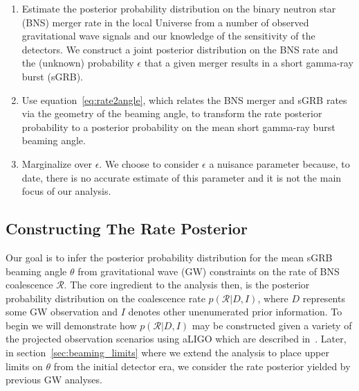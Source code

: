 \documentclass[twocolumn,nofootinbib]{revtex4-1}
\newcommand{\cbcrate}{{{\mathcal R}}}
\def\bns#1{binary neutron star#1 (BNS#1)\gdef\bns{BNS}}
\def\gw#1{gravitational wave#1 (GW#1)\gdef\gw{GW}}
\def\sgrb#1{short gamma-ray burst#1 (sGRB#1)\gdef\sgrb{sGRB}}
\begin{document}
\begin{enumerate}
    \item Estimate the posterior probability distribution on the \bns{} merger rate
    in the local Universe from a number of observed gravitational wave signals
    and our knowledge of the sensitivity of the detectors.  We construct a joint
    posterior distribution on the \bns{} rate and the (unknown) probability
    $\epsilon$ that a given merger results in a \sgrb{}.
\item Use equation~\ref{eq:rate2angle}, which relates the \bns{} merger and
    \sgrb{} rates via the geometry of the beaming angle, to transform the rate
    posterior probability to a posterior probability on the mean short gamma-ray
    burst beaming angle.
\item Marginalize over $\epsilon$. We choose to consider $\epsilon$ a nuisance
    parameter because, to date, there is no accurate estimate of this parameter
    and it is not the main focus of our analysis. 
\end{enumerate}


\subsection{Constructing The Rate Posterior}
\label{sec:rate_posterior}
%

Our goal is to infer the posterior probability distribution for the mean \sgrb{}
beaming angle $\theta$ from \gw{} constraints on the rate of \bns{} coalescence
$\cbcrate$.  The core ingredient to the analysis then, is the posterior
probability distribution on the coalescence rate $p(\cbcrate|D,I)$, where $D$
represents some \gw{} observation and $I$ denotes other unenumerated prior
information.   To begin we will demonstrate how $p(\cbcrate|D,I)$ may be
constructed given a variety of the projected observation scenarios using aLIGO
which are described in~\cite{ade_prospects}.  Later, in
section~\ref{sec:beaming_limits} where we extend the analysis to place upper
limits on $\theta$ from the initial detector era, we consider the rate posterior
yielded by previous \gw{} analyses.
\end{document}

